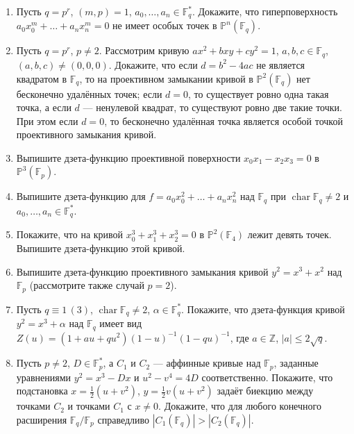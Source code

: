 \documentclass[a4paper, 11pt]{article}
\begin{document}
\begin{enumerate}[topsep=0pt]
\begin{itemize}[topsep=0pt]
        \item если $(m,p)=1$ ($p=\operatorname{char} \mathbb{F}_q$) и для $a=(a_0,\dots,a_n)$ при всех $i$ выполняется $\frac{\partial f}{\partial x_i}(a)=0$, то $f(a)=0$. (Такая точка $a$ называется особой точкой гиперповерхности $f=0$; в проективном случае предполагается, что $a\neq 0$.) %
    \end{itemize}
    \item Пусть $q=p^r$, $(m,p)=1$, $a_0,\dots,a_n\in\mathbb{F}_q^*$. Докажите, что гиперповерхность $a_0 x_0^m + \dots + a_n x_n^m=0$ не имеет особых точек в $\mathbb{P}^n(\mathbb{F}_q)$. %
    \item Пусть $q=p^r$, $p\neq 2$. Рассмотрим кривую $ax^2+bxy+cy^2=1$, $a,b,c\in\mathbb{F}_q$, $(a,b,c)\neq(0,0,0)$. Докажите, что если $d=b^2-4ac$ не является квадратом в $\mathbb{F}_q$, то на проективном замыкании кривой в $\mathbb{P}^2(\mathbb{F}_q)$ нет бесконечно удалённых точек; если $d=0$, то существует ровно одна такая точка, а если $d$ --- ненулевой квадрат, то существуют ровно две такие точки. При этом если $d=0$, то бесконечно удалённая точка является особой точкой проективного замыкания кривой. %
    \item Выпишите дзета-функцию проективной поверхности $x_0 x_1 - x_2 x_3=0$ в $\mathbb{P}^3(\mathbb{F}_p)$. %
    \item Выпишите дзета-функцию для $f = a_0 x_0^2 + \dots + a_n x_n^2$ над $\mathbb{F}_q$ при $\operatorname{char}\mathbb{F}_q\neq 2$ и $a_0,\dots,a_n\in\mathbb{F}_q^*$. %
    \item Покажите, что на кривой $x_0^3+x_1^3+x_2^3 = 0$ в $\mathbb{P}^2(\mathbb{F}_4)$ лежит девять точек. Выпишите дзета-функцию этой кривой. %
    \item Выпишите дзета-функцию проективного замыкания кривой $y^2=x^3+x^2$ над $\mathbb{F}_p$ (рассмотрите также случай $p=2$). %
    \item Пусть $q \equiv 1\,(3)$, $\operatorname{char}\mathbb{F}_q\neq 2$, $\alpha\in\mathbb{F}_q^*$. Покажите, что дзета-функция кривой $y^2=x^3+\alpha$ над $\mathbb{F}_q$ имеет вид $Z(u) = (1+au+qu^2)(1-u)^{-1}(1-qu)^{-1}$, где $a\in\mathbb{Z}$, $|a|\leqslant 2\sqrt{q}$. %
    \item Пусть $p\neq 2$, $D\in\mathbb{F}_p^*$, а $C_1$ и $C_2$ --- аффинные кривые над $\mathbb{F}_p$, заданные уравнениями $y^2=x^3-Dx$ и $u^2-v^4=4D$ соответственно. Покажите, что подстановка $x=\frac{1}{2}(u+v^2)$, $y=\frac{1}{2}v(u+v^2)$ задаёт биекцию между точками $C_2$ и точками $C_1$ с $x\neq 0$. Докажите, что для любого конечного расширения $\mathbb{F}_q/\mathbb{F}_p$ справедливо $|C_1(\mathbb{F}_q)| > |C_2(\mathbb{F}_q)|$. %
\end{enumerate}
\end{document}

